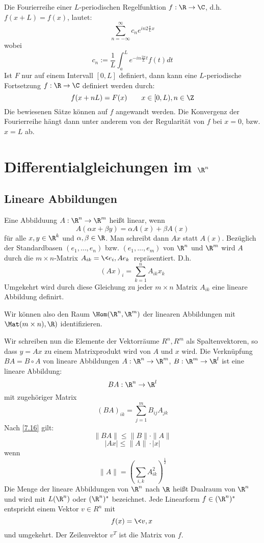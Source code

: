 \documentclass[a4paper,10pt]{scrartcl}
\begin{document}
\begin{note}[Schlussbemerkungen]
Die Fourierreihe einer $L$-periodischen Regelfunktion $f:\R\to\C$, d.h. $f(x+L)=f(x)$,
lautet:
\[
\sum_{n=-\infty}^\infty c_ne^{in2\frac\pi Lx}
\]
wobei
\[
c_n:= \frac 1L \int_{a}^Le^{-in\frac{2\pi}Lt}f(t)dt
\]
Ist $F$ nur auf einem Intervall $[0,L]$ definiert, dann kann eine $L$-periodische Fortsetzung
$f:\R\to\C$ definiert werden durch:
\[
f(x+nL)=F(x) \qquad x\in[0,L), n\in\Z
\]
Die bewiesenen Sätze können auf $f$ angewandt werden.
Die Konvergenz der Fourierreihe hängt dann unter anderem von der Regularität von $f$ bei $x=0$, bzw. $x=L$ ab.
\end{note}

\section{Differentialgleichungen im $\R^n$}

\subsection{Lineare Abbildungen}
Eine Abbilduung $A:\R^n\to\R^m$ heißt linear, wenn
\[
A(\alpha x+\beta y)=\alpha A(x)+\beta A(x)
\]
für alle $x,y \in \R^k$ und $\alpha,\beta\in\R$.
Man schreibt dann $Ax$ statt $A(x)$.
Bezüglich der Standardbasen $(e_1,\dotsc,e_n)$ bzw. $(e_1,\dotsc,e_m)$ von $\R^n$ und $\R^m$ wird
$A$ durch die $m\times n$-Matrix $A_{ik}=\<e_{i},Ae_k\>$ repräsentiert.
D.h.
\[
(Ax)_i=\sum_{k=1}^nA_{ik}x_k
\]
Umgekehrt wird durch diese Gleichung zu jeder $m\times n$ Matrix $A_{ik}$ eine lineare Abbildung definirt.

Wir können also den Raum $\Hom(\R^n,\R^m)$ der linearen Abbildungen mit $\Mat(m\times n),\R)$ identifizieren.

Wir schreiben nun die Elemente der Vektorräume $R^n, R^m$ als Spaltenvektoren, so dass $y=Ax$ zu einem Matrixprodukt wird von $A$ und $x$ wird.
Die Verknüpfung $BA = B\circ A$ von lineare Abbildungen $A:\R^n\to\R^m$, $B:\R^m\to\R^l$ ist eine lineare Abbildung:
\[
BA: \R^n\to\R^l
\]
mit zugehöriger Matrix
\[
(BA)_{ik}=\sum_{j=1}^m B_{ij}A_{jk}
\]
Nach \ref{7.16} gilt:
\[
\|BA\|\le \|B\|\cdot \|A\|
\]
\[
|Ax|\le \|A\|\cdot |x|
\]
wenn
\[
\|A\|=\left(\sum_{i,k}A_{ik}^2\right)^{\frac 12}
\]
Die Menge der lineare Abbildungen von $\R^n$ nach $\R$ heißt Dualraum von $\R^n$ und wird mit $L(\R^n)$ oder $(\R^n)^*$ bezeichnet.
Jede Linearform $f\in(\R^n)^*$ entspricht einem Vektor $v\in R^n$ mit
\[
f(x)=\<v,x\>
\]
und umgekehrt.
Der Zeilenvektor $v^T$ ist die Matrix von $f$.
\end{document}

